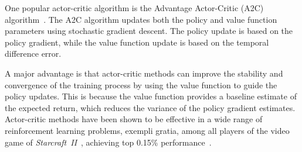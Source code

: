 One popular actor-critic algorithm is the Advantage Actor-Critic (A2C) algorithm~\autocite{mnih2016}.
The A2C algorithm updates both the policy and value function parameters using stochastic gradient descent.
The policy update is based on the policy gradient, while the value function update is based on the temporal difference error.

A major advantage is that actor-critic methods can improve the stability and convergence of the training process by using the value function to guide the policy updates.
This is because the value function provides a baseline estimate of the expected return, which reduces the variance of the policy gradient estimates.
Actor-critic methods have been shown to be effective in a wide range of reinforcement learning problems, exempli gratia, among all players of the video game of \textit{Starcraft~II}~\autocite{starcraft}, achieving top 0.15\% performance~\autocite{vinyals2019}.